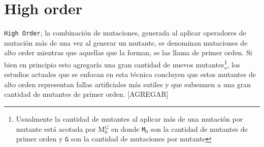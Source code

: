 \section{High order}

\texttt{High Order}, la combinaci\'on de mutaciones, generada al aplicar operadores de mutaci\'on m\'as de una vez al generar un mutante, se denominan mutaciones de alto order mientras que aquellas que la forman, se las llama de primer orden. Si bien en principio esto agregar\'ia una gran cantidad de nuevos mutantes\footnote{Usualmente la cantidad de mutantes al aplicar m\'as de una mutaci\'on por mutante est\'a acotada por M$_0^G$ en donde \texttt{M$_0$} son la cantidad de mutantes de primer orden y \texttt{G} son la cantidad de mutaciones por mutante}, los estudios actuales que se enfocan en esta t\'ecnica concluyen que estos mutantes de alto orden representan fallas artificiales m\'as sutiles y que subsumen a una gran cantidad de mutantes de primer orden. [AGREGAR]